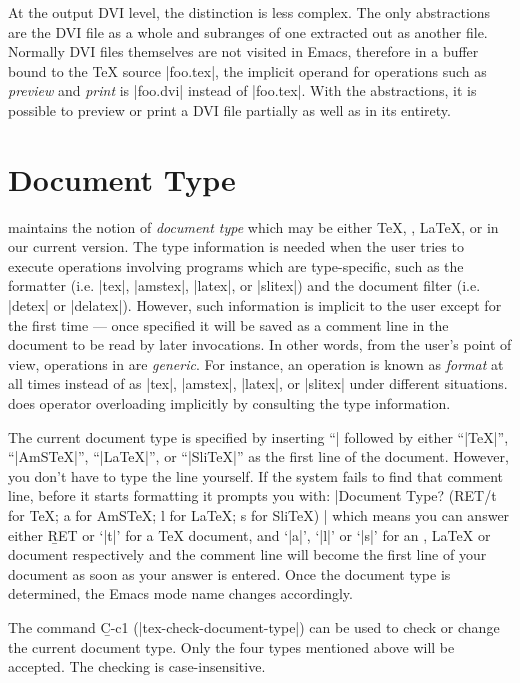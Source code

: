 \noindent
At the output DVI level, the distinction is less complex.
The only abstractions are the DVI file as a whole and
subranges of one extracted out as another file.  
Normally DVI files themselves are not visited in Emacs,
therefore in a buffer bound to the {\TeX} source
|foo.tex|, the implicit operand for operations such as {\it preview\/}
and {\it print\/} is |foo.dvi| instead of |foo.tex|.
With the abstractions, it is possible to preview or print a DVI file
partially as well as in its entirety.


\section{Document Type}

\noindent
{\TM} maintains the notion of {\it document type\/} which may 
be either {\TeX}, {\AmSTeX}, {\LaTeX}, or {\SliTeX} in our current version.  
The type information is needed when the user tries to execute operations
involving programs which are type-specific,
such as the formatter (i.e. |tex|, |amstex|, |latex|, or |slitex|)
and the document filter (i.e. |detex| or |delatex|).
However, such information is implicit to the user except for the first time
--- once specified it will be saved as a comment line in the document to be
read by later invocations.  In other words, from the user's point of view,
operations in {\TM} are {\it generic\/}.  For instance,
an operation is known as {\it format\/} at all times
instead of as |tex|, |amstex|, |latex|, or |slitex| under different situations.
\hbox{\TM} does operator overloading implicitly by consulting the type information.

The current document type is specified by inserting ``|%
followed by either ``|TeX|'', ``|AmSTeX|'', ``|LaTeX|'', or ``|SliTeX|''
as the first line of the document.
However, you don't have to type the line yourself.
If the system fails to find that comment line, before it
starts formatting it prompts you with:
\begindisplay
|Document Type? (RET/t for TeX; a for AmSTeX; l for LaTeX; s for SliTeX) |\cr
\enddisplay
which means you can answer either {\b RET} or `|t|' for a {\TeX} document,
and `|a|', `|l|' or `|s|' for an {\AmSTeX}, {\LaTeX} or {\SliTeX} document
respectively
and the comment line will become the first line of your document
as soon as your answer is entered.  Once the document type is determined,
the Emacs mode name changes accordingly.

The command {\b C-c{\s}1} (|tex-check-document-type|) can be used to
check or change the current document type.  Only the four types mentioned
above will be accepted.  The checking is case-insensitive.



